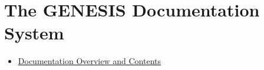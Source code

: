 \documentclass[12pt]{article}
\begin{document}
\section*{The GENESIS Documentation System}

\begin{itemize}
\item \href{../documentation-overview/documentation-overview.tex}{Documentation Overview and Contents}
\end{itemize}
\end{document}

